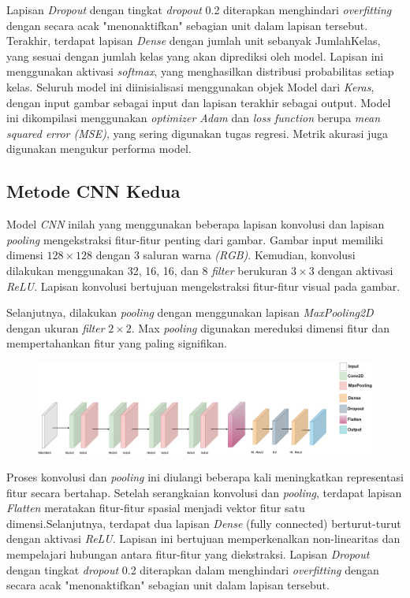 Lapisan \textit{Dropout} dengan tingkat \textit{dropout} 0.2 diterapkan menghindari \textit{overfitting} dengan secara acak "menonaktifkan" sebagian unit dalam lapisan tersebut. Terakhir, terdapat lapisan {\textit{Dense}} dengan jumlah unit sebanyak JumlahKelas, yang sesuai dengan jumlah kelas yang akan diprediksi oleh model. Lapisan ini menggunakan aktivasi \textit{softmax}, yang menghasilkan distribusi probabilitas setiap kelas. Seluruh model ini diinisialisasi menggunakan objek Model dari \textit{Keras}, dengan input gambar sebagai input dan lapisan terakhir sebagai output. Model ini dikompilasi menggunakan \textit{optimizer Adam} dan \textit{loss function} berupa \textit{mean squared error (MSE)}, yang sering digunakan tugas regresi. Metrik akurasi juga digunakan mengukur performa model.

\subsection{Metode CNN Kedua}
Model \textit{CNN} inilah yang menggunakan beberapa lapisan konvolusi dan lapisan \textit{pooling} mengekstraksi fitur-fitur penting dari gambar. Gambar input memiliki dimensi $128 \times 128$ dengan 3 saluran warna \textit{(RGB)}. Kemudian, konvolusi dilakukan menggunakan 32, 16, 16, dan 8 \textit{filter} berukuran $3 \times 3$ dengan aktivasi \textit{ReLU}. Lapisan konvolusi bertujuan mengekstraksi fitur-fitur visual pada gambar.

Selanjutnya, dilakukan \textit{pooling} dengan menggunakan lapisan \textit{MaxPooling2D} dengan ukuran \textit{filter} $2 \times 2$. Max \textit{pooling} digunakan mereduksi dimensi fitur dan mempertahankan fitur yang paling signifikan.

\begin{figure}[hbt!]
	\centering
	\includegraphics[width=1.0\linewidth]{gambar/bener/Arsitektur_CNN2_Revisi.png}
	\label{fig:layerCNN}
\end{figure}

Proses konvolusi dan \textit{pooling} ini diulangi beberapa kali meningkatkan representasi fitur secara bertahap. Setelah serangkaian konvolusi dan \textit{pooling}, terdapat lapisan \textit{Flatten} meratakan fitur-fitur spasial menjadi vektor fitur satu dimensi.Selanjutnya, terdapat dua lapisan \textit{Dense} (fully connected) berturut-turut dengan aktivasi \textit{ReLU}. Lapisan ini bertujuan memperkenalkan non-linearitas dan mempelajari hubungan antara fitur-fitur yang diekstraksi. Lapisan \textit{Dropout} dengan tingkat \textit{dropout} 0.2 diterapkan dalam menghindari \textit{overfitting} dengan secara acak "menonaktifkan" sebagian unit dalam lapisan tersebut.

